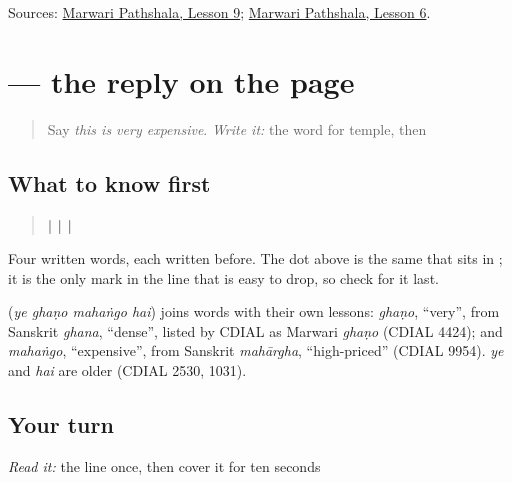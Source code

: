 \begin{tcolorbox}[breakable,colback=teal!4,colframe=teal!35!black,title={Before you move on}]
Sources: \href{https://www.marwaripathshala.com/marwari-lesson-9-english}{Marwari Pathshala, Lesson 9}; \href{https://www.marwaripathshala.com/marwari-lesson-6-english}{Marwari Pathshala, Lesson 6}.
\end{tcolorbox}
\section[\texorpdfstring{\mw{ये} \mw{घणो} \mw{महंगो} \mw{है।} (ye ghaṇo mahaṅgo hai.)}{ये घणो महंगो है। (ye ghaṇo mahaṅgo hai.)}]{    — the reply on the page}

\label{lesson:MW-C23-price-answer}



\begin{quote}
Say \emph{this is very expensive}. \emph{Write it:} the word for temple, then \textbf{}
\end{quote}

\subsection*{What to know first}
\begin{quote}
\textbf{ |  |  | }
\end{quote}

Four written words, each written before. The dot above \textbf{} is the same \textbf{} that sits in \textbf{}; it is the only mark in the line that is easy to drop, so check for it last.

\begin{cousinweb}
\textbf{   } (\emph{ye ghaṇo mahaṅgo hai}) joins words with their own lessons: \emph{ghaṇo}, \textquotedblleft{}very\textquotedblright{}, from Sanskrit \emph{ghana}, \textquotedblleft{}dense\textquotedblright{}, listed by CDIAL as Marwari \emph{ghaṇo} (CDIAL 4424); and \emph{mahaṅgo}, \textquotedblleft{}expensive\textquotedblright{}, from Sanskrit \emph{mahārgha}, \textquotedblleft{}high-priced\textquotedblright{} (CDIAL 9954). \emph{ye} and \emph{hai} are older (CDIAL 2530, 1031).
\end{cousinweb}

\subsection*{Your turn}
\emph{Read it:} the line once, then cover it for ten seconds


